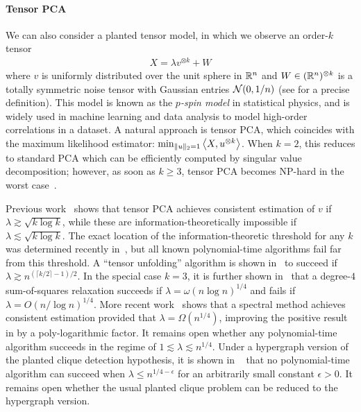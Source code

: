\paragraph{Tensor PCA}
We can also consider a planted tensor model, in which we observe an order-$k$ tensor
\begin{align}
	X = \lambda  v^{\otimes k}  + W  
	\label{eq:planted_tensor_model}
\end{align}
where $v$ is uniformly distributed over the unit sphere in ${\mathbb{R}}^n$ 
and $W \in ({\mathbb{R}}^{n})^{\otimes k}$ is a totally symmetric noise tensor with Gaussian entries ${\mathcal{N}}(0,1/n)$ (see \cite[Section 3.1]{MontanariReichmanZeitouni14} for a precise definition).  
This model is known as the \emph{$p$-spin model} in statistical physics, and is widely used in machine learning and data analysis to model high-order correlations in a dataset. A natural approach is tensor PCA, which coincides with the maximum likelihood estimator: $\min_{\|u\|_2 = 1} \left \langle X, u^{\otimes k} \right\rangle$.
When $k=2$, this reduces to standard PCA which can be efficiently computed by singular value decomposition; however, as soon as $k \ge 3$, tensor PCA becomes NP-hard in the worst case~\cite{Hillar2013}. 

Previous work~\cite{MontanariRichard14,MontanariReichmanZeitouni14,PerryWeinBandeira16}
shows that tensor PCA achieves consistent estimation of $v$ if $\lambda \gtrsim \sqrt{k \log k}$, while these are information-theoretically impossible if $\lambda \lesssim \sqrt{k \log k}$.  
The exact location of the information-theoretic threshold for any $k$ was determined recently in~\cite{LMLKZ17}, but all known polynomial-time algorithms fail far from this threshold.  A ``tensor unfolding'' algorithm is shown in~\cite{MontanariRichard14} to succeed if $\lambda \gtrsim n^{(\lceil k/2 \rceil -1 )/2}$.  In the special case $k=3$, it is further shown in~\cite{hopkins2015tensor} that a degree-$4$ sum-of-squares relaxation succeeds if $\lambda = \omega(n\log n)^{1/4}$ and fails if $\lambda=O(n/\log n)^{1/4}$. More recent work~\cite{zhang2017tensor} shows that a spectral method achieves consistent estimation provided that 
$\lambda=\Omega(n^{1/4})$, improving the positive result in \cite{hopkins2015tensor}  by a poly-logarithmic factor. 
It remains open whether any polynomial-time algorithm succeeds in the regime of $1 \lesssim \lambda \lesssim n^{1/4}$. 
Under a hypergraph version of the planted clique detection hypothesis, it is shown in ~\cite{zhang2017tensor} that  
 no polynomial-time algorithm can succeed when $\lambda \le n^{1/4-\epsilon}$ for an arbitrarily small constant $\epsilon>0$. 
It remains open whether the usual planted clique problem can be reduced to the hypergraph version.



